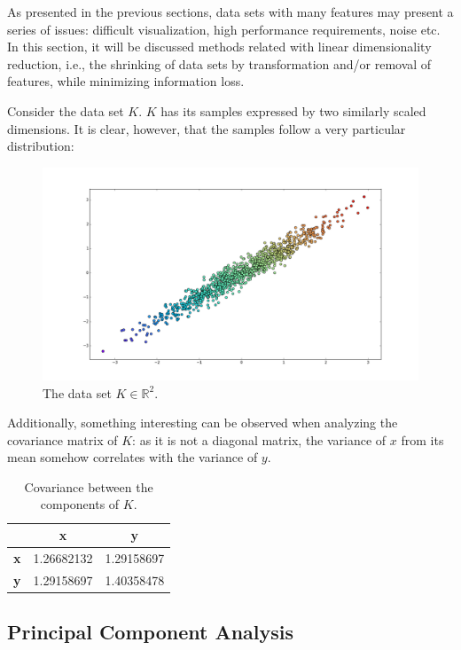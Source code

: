 \documentclass[12pt]{article}
\begin{document}
As presented in the previous sections, data sets with many features may present a series of issues: difficult visualization, high performance requirements, noise etc. In this section, it will be discussed methods related with linear dimensionality reduction, i.e., the shrinking of data sets by transformation and/or removal of features, while minimizing information loss.

Consider the data set $K$. $K$ has its samples expressed by two similarly scaled dimensions. It is clear, however, that the samples follow a very particular distribution:

\begin{figure}[H]
    \centering
	\captionsetup{justification=centering}

	\includegraphics[width=.8\linewidth]{datasetr}
	\caption{The data set $K \in \mathbb{R}^2$.}
	\label{fig:datasetr}
\end{figure}

Additionally, something interesting can be observed when analyzing the covariance matrix of $K$: as it is not a diagonal matrix, the variance of $x$ from its mean somehow correlates with the variance of $y$. \cite{pcajon2003}

\begin{table}[H]
	\centering
	\begin{tabular}{|c|c|c|}
		\hline
			& \textbf{x} & \textbf{y} \\\hline
		\textbf{x} & 1.26682132  & 1.29158697 \\\hline
		\textbf{y} & 1.29158697  & 1.40358478 \\\hline
	\end{tabular}
	\caption{Covariance between the components of $K$.}
\end{table}

\subsection{Principal Component Analysis}
\end{document}
